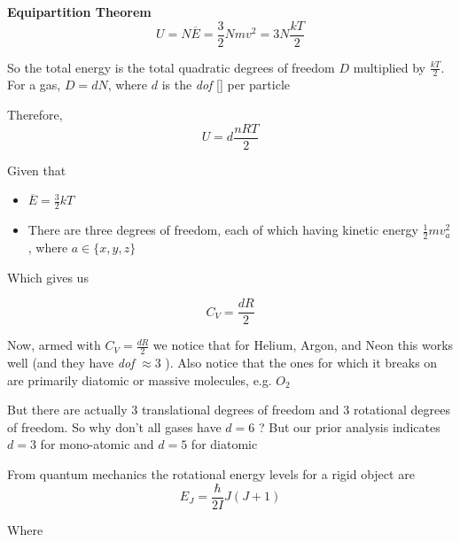 \documentclass[10pt]{article}
\begin{document}
\begin{theorem}
\textbf{Equipartition Theorem} 
\begin{equation}
	U = N \overline{E} = \frac{3}{2}N mv^2 = 3N \frac{kT}{2}
	\label{eq:294:equipartition_thm}
\end{equation}

So the total energy is the total quadratic degrees of freedom $ D $  multiplied by $ \frac{kT}{2} $. 
For a gas, $ D = dN $, where $ d $ is the \textit{dof} [] per particle

Therefore,
\begin{equation}
	U = d \frac{nRT}{2}
\end{equation}


Given that
\begin{itemize}
	\item $ \overline{E} = \frac{3}{2} kT $ 
	\item There are three degrees of freedom, each of which having kinetic energy $ \frac{1}{2} mv_a^2$, where $ a \in \{x, y, z\} $ 
\end{itemize}

Which gives us

\begin{equation}
	C_V = \frac{dR}{2}
\end{equation}



\end{theorem}

Now, armed with $ C_V = \frac{dR}{2} $ we notice that for Helium, Argon, and Neon this works well (and they have \textit{dof} $\approx 3$ ).
Also notice that the ones for which it breaks on are primarily diatomic or massive molecules, e.g. $ O_2 $ 

But there are actually 3 translational degrees of freedom and 3 rotational degrees of freedom. 
So why don't all gases have $ d = 6$ ? But our prior analysis indicates $ d = 3 $ for mono-atomic and $ d = 5 $ for diatomic

From quantum mechanics the rotational energy levels for a rigid object are 
\begin{equation}
	E_J = \frac{\hbar}{2I} J(J+1)
	\label{eq:294:rot_energy_level}
\end{equation}

Where 
\end{document}
